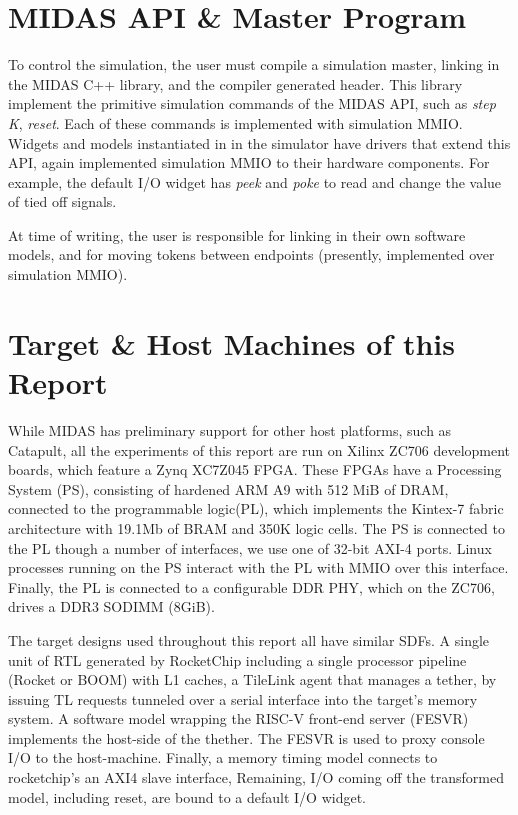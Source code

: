 \section{MIDAS API \& Master Program}

To control the simulation, the user must compile a simulation master, linking
in the MIDAS C++ library, and the compiler generated header. This library
implement the primitive simulation commands of the MIDAS API, such as
\emph{step K}, \emph{reset}. Each of these commands is implemented with
simulation MMIO.  Widgets and models instantiated in in the simulator have
drivers that extend this API, again implemented simulation MMIO to their
hardware components. For example, the default I/O widget has \emph{peek} and
\emph{poke} to read and change the value of tied off signals.

At time of writing, the user is responsible for linking in their own software
models, and for moving tokens between endpoints (presently, implemented over
simulation MMIO).

\section{Target \& Host Machines of this Report}

While MIDAS has preliminary support for other host platforms, such as Catapult,
all the experiments of this report are run on Xilinx ZC706 development boards,
which feature a Zynq XC7Z045 FPGA. These FPGAs have a Processing System (PS),
consisting of hardened ARM A9 with 512 MiB of DRAM, connected to the
programmable logic(PL), which implements the Kintex-7 fabric architecture with
19.1Mb of BRAM and 350K logic cells. The PS is connected to the PL though a
number of interfaces, we use one of 32-bit AXI-4 ports. Linux processes
running on the PS interact with the PL with MMIO over this interface.  Finally,
the PL is connected to a configurable DDR PHY, which on the ZC706, drives a
DDR3 SODIMM (8GiB).

The target designs used throughout this report all have similar SDFs.
 A single unit of RTL generated by RocketChip
including a single processor pipeline (Rocket or BOOM) with L1 caches, a
TileLink agent that manages a tether, by issuing TL requests tunneled over a
serial interface into the target's memory system. A software model wrapping the
RISC-V front-end server (FESVR) implements the host-side of the thether. The
FESVR is used to proxy console I/O to the host-machine.  Finally, a memory
timing model connects to rocketchip's an AXI4 slave interface, Remaining, I/O
coming off the transformed model, including reset, are bound to a default I/O
widget.

